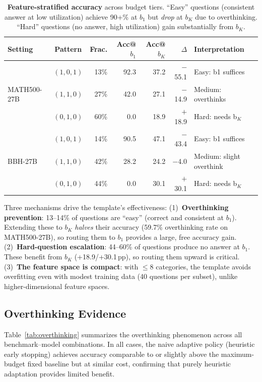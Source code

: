 \begin{table}[ht]
\centering
\caption{\textbf{Feature-stratified accuracy} across budget tiers. ``Easy'' questions (consistent answer at low utilization) achieve 90+\% at $b_1$ but \emph{drop} at $b_K$ due to overthinking. ``Hard'' questions (no answer, high utilization) gain substantially from $b_K$.}
\label{tab:feature-analysis}
\small
\begin{tabular}{@{}lcrrrrl@{}}
\toprule
\textbf{Setting} & \textbf{Pattern} & \textbf{Frac.} & \textbf{Acc@}$b_1$ & \textbf{Acc@}$b_K$ & $\Delta$ & \textbf{Interpretation} \\
\midrule
\multirow{3}{*}{MATH500-27B} & $(1,0,1)$ & 13\% & 92.3 & 37.2 & $-$55.1 & Easy: b1 suffices \\
 & $(1,1,0)$ & 27\% & 42.0 & 27.1 & $-$14.9 & Medium: overthinks \\
 & $(0,1,0)$ & 60\% & 0.0 & 18.9 & $+$18.9 & Hard: needs b$_K$ \\
\midrule
\multirow{3}{*}{BBH-27B} & $(1,0,1)$ & 14\% & 90.5 & 47.1 & $-$43.4 & Easy: b1 suffices \\
 & $(1,1,0)$ & 42\% & 28.2 & 24.2 & $-$4.0 & Medium: slight overthink \\
 & $(0,1,0)$ & 44\% & 0.0 & 30.1 & $+$30.1 & Hard: needs b$_K$ \\
\bottomrule
\end{tabular}
\end{table}

Three mechanisms drive the template's effectiveness:
(1)~\textbf{Overthinking prevention}: 13--14\% of questions are ``easy'' (correct and consistent at $b_1$).
Extending these to $b_K$ \emph{halves} their accuracy (59.7\% overthinking rate on MATH500-27B), so routing them to $b_1$ provides a large, free accuracy gain.
(2)~\textbf{Hard-question escalation}: 44--60\% of questions produce no answer at $b_1$. These benefit from $b_K$ (+18.9/+30.1\,pp), so routing them upward is critical.
(3)~\textbf{The feature space is compact}: with $\leq 8$ categories, the template avoids overfitting even with modest training data (40 questions per subset), unlike higher-dimensional feature spaces.

\subsection{Overthinking Evidence}
\label{app:overthinking}

Table~\ref{tab:overthinking} summarizes the overthinking phenomenon across all benchmark--model combinations.
In all cases, the naive adaptive policy (heuristic early stopping) achieves accuracy comparable to or slightly above the maximum-budget fixed baseline but at similar cost, confirming that purely heuristic adaptation provides limited benefit.

